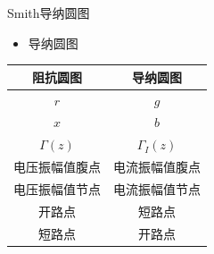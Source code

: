 \begin{frame}
\begin{columns}
\begin{column}{0.6\linewidth}
    \end{column}
  \end{columns}
\end{frame}

\begin{frame}{Smith导纳圆图}
  \begin{itemize}
    \item 导纳圆图
  \end{itemize}
  \begin{tabular}{|c|c|}
    \hline
    \textbf{阻抗圆图}   & \textbf{导纳圆图}      \\ \hline
    $r$                 &  $g$             \\ \hline
    $x$                 &  $b$             \\ \hline
    $\Gamma(z)$         & $\Gamma_I(z)$     \\ \hline
    电压振幅值腹点       & 电流振幅值腹点      \\ \hline
    电压振幅值节点        & 电流振幅值节点     \\ \hline
    开路点              & 短路点             \\ \hline
    短路点              & 开路点              \\ 
    \hline
  \end{tabular}
\end{frame}

